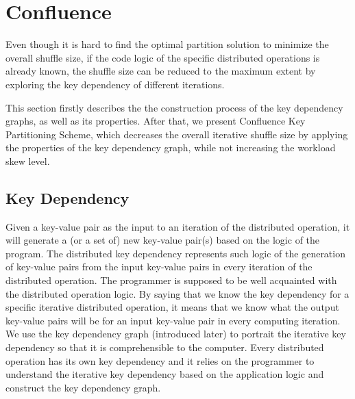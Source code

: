\documentclass[10pt,journal,compsoc]{IEEEtran}
\begin{document}
\section{Confluence}\label{section:keyDependencyGraph}
Even though it is hard to find the optimal partition solution to minimize the overall shuffle size,
if the code logic of the specific distributed operations is already known, 
the shuffle size can be reduced to the maximum extent %
by exploring the key dependency of different iterations. 

This section firstly describes the the construction process of the key dependency graphs, as well as its properties. 
After that, we present Confluence Key Partitioning Scheme, which decreases the overall iterative shuffle size by applying the properties of the key dependency graph, while not increasing the workload skew level. 


\subsection{Key Dependency}\label{section:dependency}
Given a key-value pair as the input to an iteration of the distributed operation,
it will generate a (or a set of) new key-value pair(s) based on the logic of the program. 
The distributed key dependency
represents such logic of the generation of key-value pairs from the input key-value pairs in every iteration
of the distributed operation. 
The programmer is supposed to be well acquainted with the distributed operation logic. 
By saying that we know the key dependency for a specific iterative distributed operation,
it means that we know what the output key-value pairs will be 
for an input key-value pair in every computing iteration. 
We use the key dependency graph (introduced later) to portrait the iterative key dependency
so that it is comprehensible to the computer. 
Every distributed operation has its own key dependency
and it relies on the programmer to understand the iterative key dependency based on the application logic
and construct the key dependency graph.
\end{document}
